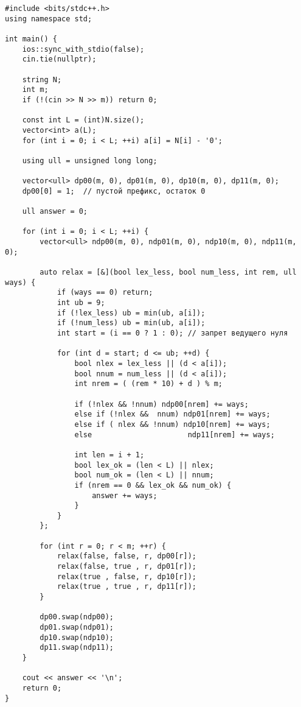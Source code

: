 \documentclass[12pt,a4paper]{article}
\begin{document}
\begin{lstlisting}[style=cppstyle]
#include <bits/stdc++.h>
using namespace std;

int main() {
    ios::sync_with_stdio(false);
    cin.tie(nullptr);
    
    string N;
    int m;
    if (!(cin >> N >> m)) return 0;

    const int L = (int)N.size();
    vector<int> a(L);
    for (int i = 0; i < L; ++i) a[i] = N[i] - '0';

    using ull = unsigned long long;

    vector<ull> dp00(m, 0), dp01(m, 0), dp10(m, 0), dp11(m, 0);
    dp00[0] = 1;  // пустой префикс, остаток 0

    ull answer = 0;

    for (int i = 0; i < L; ++i) {
        vector<ull> ndp00(m, 0), ndp01(m, 0), ndp10(m, 0), ndp11(m, 0);

        auto relax = [&](bool lex_less, bool num_less, int rem, ull ways) {
            if (ways == 0) return;
            int ub = 9;
            if (!lex_less) ub = min(ub, a[i]);
            if (!num_less) ub = min(ub, a[i]);
            int start = (i == 0 ? 1 : 0); // запрет ведущего нуля

            for (int d = start; d <= ub; ++d) {
                bool nlex = lex_less || (d < a[i]);
                bool nnum = num_less || (d < a[i]);
                int nrem = ( (rem * 10) + d ) % m;

                if (!nlex && !nnum) ndp00[nrem] += ways;
                else if (!nlex &&  nnum) ndp01[nrem] += ways;
                else if ( nlex && !nnum) ndp10[nrem] += ways;
                else                      ndp11[nrem] += ways;

                int len = i + 1;
                bool lex_ok = (len < L) || nlex; 
                bool num_ok = (len < L) || nnum; 
                if (nrem == 0 && lex_ok && num_ok) {
                    answer += ways;
                }
            }
        };

        for (int r = 0; r < m; ++r) {
            relax(false, false, r, dp00[r]);
            relax(false, true , r, dp01[r]);
            relax(true , false, r, dp10[r]);
            relax(true , true , r, dp11[r]);
        }

        dp00.swap(ndp00);
        dp01.swap(ndp01);
        dp10.swap(ndp10);
        dp11.swap(ndp11);
    }

    cout << answer << '\n';
    return 0;
}
\end{lstlisting}
\end{document}
